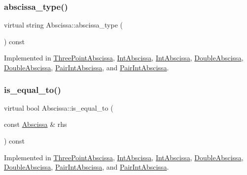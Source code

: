 \subsubsection{\texorpdfstring{abscissa\_type()}{abscissa\_type()}\hspace{0.1cm}{\footnotesize\ttfamily [2/2]}}
{\footnotesize\ttfamily virtual string Abscissa\+::abscissa\+\_\+type (\begin{DoxyParamCaption}{ }\end{DoxyParamCaption}) const\hspace{0.3cm}{\ttfamily [pure virtual]}}



Implemented in \mbox{\hyperlink{classThreePointAbscissa_a44344558fa4ee658be3344dfc3e69b17}{Three\+Point\+Abscissa}}, \mbox{\hyperlink{classIntAbscissa_a3d21dd199d2e7623429fadce5092ac88}{Int\+Abscissa}}, \mbox{\hyperlink{classIntAbscissa_a3d21dd199d2e7623429fadce5092ac88}{Int\+Abscissa}}, \mbox{\hyperlink{classDoubleAbscissa_ae69cb78334800cb8477daf2cefb4d67e}{Double\+Abscissa}}, \mbox{\hyperlink{classDoubleAbscissa_ae69cb78334800cb8477daf2cefb4d67e}{Double\+Abscissa}}, \mbox{\hyperlink{classPairIntAbscissa_a7b186cfb2c2d44289b12f0ade56ea948}{Pair\+Int\+Abscissa}}, and \mbox{\hyperlink{classPairIntAbscissa_a7b186cfb2c2d44289b12f0ade56ea948}{Pair\+Int\+Abscissa}}.

\mbox{\label{classAbscissa_a4adf4055c1eee010f9493e0ebb66348a}} 
\subsubsection{\texorpdfstring{is\_equal\_to()}{is\_equal\_to()}\hspace{0.1cm}{\footnotesize\ttfamily [1/2]}}
{\footnotesize\ttfamily virtual bool Abscissa\+::is\+\_\+equal\+\_\+to (\begin{DoxyParamCaption}\item[{const \mbox{\hyperlink{classAbscissa}{Abscissa}} \&}]{rhs }\end{DoxyParamCaption}) const\hspace{0.3cm}{\ttfamily [pure virtual]}}



Implemented in \mbox{\hyperlink{classThreePointAbscissa_a91dd5c897c1b2b1fe271597fdc0d5c3d}{Three\+Point\+Abscissa}}, \mbox{\hyperlink{classIntAbscissa_a4d7663a45e6882b5d57dd59262d3900b}{Int\+Abscissa}}, \mbox{\hyperlink{classIntAbscissa_a4d7663a45e6882b5d57dd59262d3900b}{Int\+Abscissa}}, \mbox{\hyperlink{classDoubleAbscissa_ac62533c5fa000e272ad818c0afe7f02b}{Double\+Abscissa}}, \mbox{\hyperlink{classDoubleAbscissa_ac62533c5fa000e272ad818c0afe7f02b}{Double\+Abscissa}}, \mbox{\hyperlink{classPairIntAbscissa_a9f4bf45aafd0efa0a47fa6e8b77e25fa}{Pair\+Int\+Abscissa}}, and \mbox{\hyperlink{classPairIntAbscissa_a9f4bf45aafd0efa0a47fa6e8b77e25fa}{Pair\+Int\+Abscissa}}.

